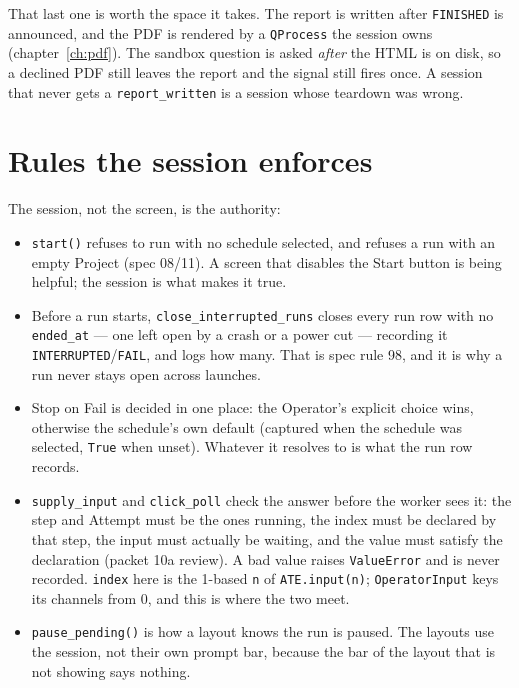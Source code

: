 That last one is worth the space it takes. The report is written after \texttt{FINISHED} is announced,
and the PDF is rendered by a \texttt{QProcess} the session owns (chapter~\ref{ch:pdf}). The sandbox
question is asked \emph{after} the HTML is on disk, so a declined PDF still leaves the report and the
signal still fires once. A session that never gets a \texttt{report\_written} is a session whose teardown
was wrong.

\section{Rules the session enforces}

The session, not the screen, is the authority:

\begin{itemize}
  \item \texttt{start()} refuses to run with no schedule selected, and refuses a run with an empty
    Project (spec 08/11). A screen that disables the Start button is being helpful; the session is what
    makes it true.
  \item Before a run starts, \texttt{close\_\allowbreak{}interrupted\_\allowbreak{}runs} closes every run row with no
    \texttt{ended\_at} --- one left open by a crash or a power cut --- recording it
    \texttt{INTERRUPTED}/\texttt{FAIL}, and logs how many. That is spec rule 98, and it is why a run
    never stays open across launches.
  \item Stop on Fail is decided in one place: the Operator's explicit choice wins, otherwise the
    schedule's own default (captured when the schedule was selected, \texttt{True} when unset). Whatever
    it resolves to is what the run row records.
  \item \texttt{supply\_input} and \texttt{click\_poll} check the answer before the worker sees it: the
    step and Attempt must be the ones running, the index must be declared by that step, the input must
    actually be waiting, and the value must satisfy the declaration (packet 10a review). A bad value
    raises \texttt{ValueError} and is never recorded. \texttt{index} here is the 1-based \texttt{n} of
    \texttt{ATE.input(n)}; \texttt{OperatorInput} keys its channels from 0, and this is where the two
    meet.
  \item \texttt{pause\_pending()} is how a layout knows the run is paused. The layouts use the session,
    not their own prompt bar, because the bar of the layout that is not showing says nothing.
\end{itemize}

